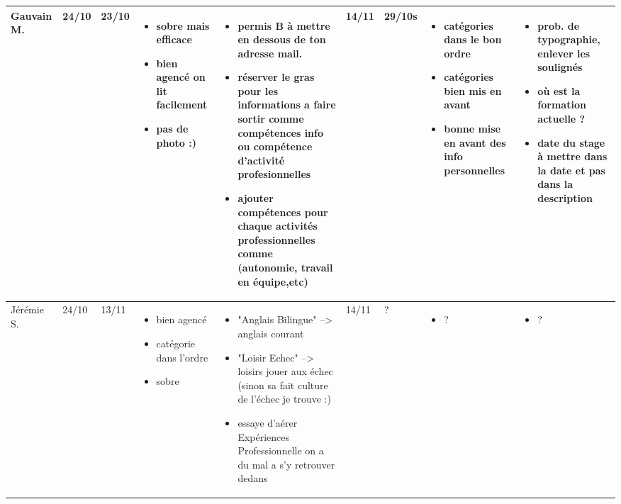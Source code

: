 \documentclass[a4paper,11pt]{article}
\begin{document}
\begin{landscape}
\begin{longtable}{|l|l|l|p{4cm}|p{4cm}|l|l|p{4cm}|p{4cm}|}
    Gauvain M. 	& 24/10 & 23/10 
				& \begin{itemize}
				  \item sobre mais efficace
				  \item bien agencé on lit facilement
				  \item pas de photo :)
				  \end{itemize}
				& \begin{itemize}
				  \item permis B à mettre en dessous de ton adresse mail.
				  \item réserver le gras pour les informations a faire sortir comme compétences info ou compétence d'activité profesionnelles
				  \item ajouter compétences pour chaque activités professionnelles comme (autonomie, travail en équipe,etc)
				  \end{itemize}
				& 14/11 & 29/10s
				& \begin{itemize}
				  \item catégories dans le bon ordre
				  \item catégories bien mis en avant
				  \item bonne mise en avant des info personnelles
				  \end{itemize} 
				& \begin{itemize}
				  \item prob. de typographie, enlever les soulignés
				  \item où est la formation actuelle ?
				  \item date du stage à mettre dans la date et pas dans la description
				  \end{itemize} \\ \hline

    Jérémie S.  & 24/10 & 13/11 %
				& \begin{itemize}
				  \item bien agencé
				  \item catégorie dans l'ordre
				  \item sobre
				  \end{itemize}
				& \begin{itemize}
				  \item "Anglais Bilingue" --> anglais courant
				  \item "Loisir Echec" --> loisirs jouer aux échec (sinon sa fait culture de l’échec je trouve :)
				  \item essaye d'aérer Expériences Professionnelle on a du mal a s'y retrouver dedans
				  \end{itemize} 
				& 14/11 & ?
				& \begin{itemize}
				  \item ?
				  \end{itemize}
				& \begin{itemize}
				  \item ?
				  \end{itemize} \\ \hline


\end{longtable}
\end{landscape}
\end{document}
